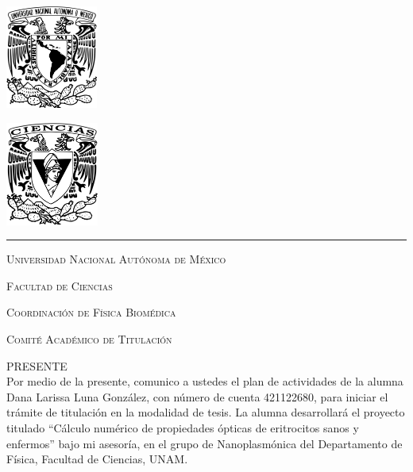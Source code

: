 \documentclass[11pt,letterpaper]{article}
\begin{document}
	
	
	\begin{center}
		\begin{minipage}{3cm}
			\begin{center}
				\includegraphics[height=3.4cm]{Logo_UNAM (1)}
			\end{center}
		\end{minipage}\hfill
		\begin{minipage}{3cm}
			\begin{center}
				\includegraphics[height=3.4cm]{Logo_FC (1)}
			\end{center}
		\end{minipage}
	\end{center}
	
	\rule{17cm}{0.1mm}
	
	\vspace{0.5cm}
	
	\hspace{10cm}{\raggedleft Ciudad Universitaria, 22 de abril de 2025}
	
	\hspace{1cm}
	
	\vspace{0.5cm}
	
	\noindent\textsc{Universidad Nacional Autónoma de México}
	
	\noindent\textsc{Facultad de Ciencias
	}
	
	\noindent\textsc{Coordinación de Física Biomédica
	}
	
	\noindent\textsc{Comité Académico de Titulación
	}
	
	\noindent\textsc{PRESENTE}\\
	
	\noindent
	Por medio de la presente, comunico a ustedes el plan de actividades de la alumna Dana Larissa Luna González, con número de cuenta 421122680, para  iniciar el trámite de titulación en la modalidad de tesis. La alumna desarrollará el proyecto titulado ``Cálculo numérico de propiedades ópticas de eritrocitos sanos y enfermos'' bajo mi asesoría, en el grupo de Nanoplasmónica del Departamento de Física, Facultad de Ciencias, UNAM.\\
	
\end{document}
